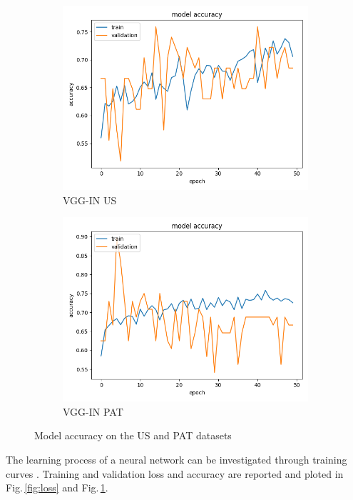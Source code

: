 \begin{figure}
\begin{subfigure}[b]{.45\linewidth}
\includegraphics[width=\linewidth]{Figs/vgg_in_us_acc.jpg}
\caption{VGG-IN US}
\end{subfigure}
\begin{subfigure}[b]{.45\linewidth}
\includegraphics[width=\linewidth]{Figs/vgg_in_pat_acc.jpg}
\caption{VGG-IN PAT}
\end{subfigure}
\caption{Model accuracy on the US and PAT datasets}
\label{fig:acc}
\end{figure}

The learning process of a neural network can be investigated through training curves \citep{Anzanello2011}. Training and validation loss and accuracy are reported and ploted in Fig.\,\ref{fig:loss} and Fig.\,\ref{fig:acc}. 


